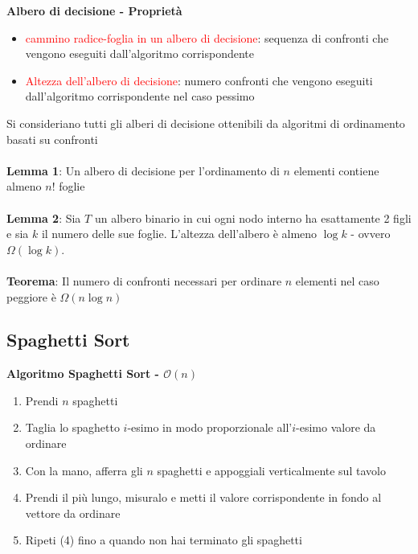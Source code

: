 \documentclass[../cheatSheetAlgoritmi.tex]{subfiles}
\begin{document}
\textbf{Albero di decisione - Proprietà}
\begin{itemize}
	\item \textcolor{red}{cammino radice-foglia in un albero di decisione}: sequenza di confronti che vengono eseguiti dall'algoritmo corrispondente
	\item \textcolor{red}{Altezza dell'albero di decisione}: numero confronti che vengono eseguiti dall'algoritmo corrispondente nel caso pessimo
\end{itemize}
Si consideriano tutti gli alberi di decisione ottenibili da algoritmi di ordinamento basati su confronti\\\\
\textbf{Lemma 1}: Un albero di decisione per l'ordinamento di $n$ elementi contiene almeno $n!$ foglie\\\\
\textbf{Lemma 2}: Sia $T$ un albero binario in cui ogni nodo interno ha esattamente 2
figli e sia $k$ il numero delle sue foglie. L’altezza dell’albero è almeno $\log k$ - ovvero $\Omega(\log k)$.\\\\
\textbf{Teorema}: Il numero di confronti necessari per ordinare $n$ elementi nel caso
peggiore è $\Omega(n \log n)$
\subsection{Spaghetti Sort}
\textbf{Algoritmo Spaghetti Sort - $\mathcal{O}(n)$}
\begin{enumerate}
	\item Prendi $n$ spaghetti
	\item Taglia lo spaghetto $i$-esimo in modo proporzionale all'$i$-esimo valore da ordinare
	\item Con la mano, afferra gli $n$ spaghetti e appoggiali verticalmente sul tavolo
	\item Prendi il più lungo, misuralo e metti il valore corrispondente in fondo al vettore da ordinare
	\item Ripeti (4) fino a quando non hai terminato gli spaghetti
\end{enumerate}
\end{document}
